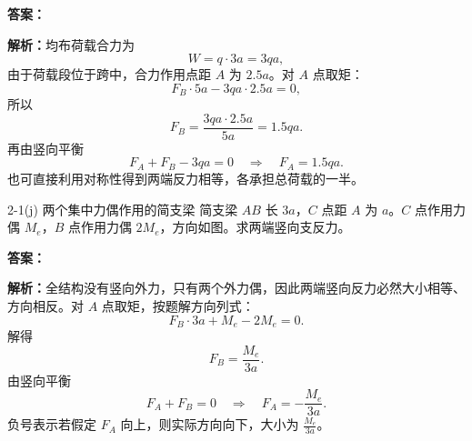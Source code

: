 \begin{solutioncard}
\textbf{答案：}

\textbf{解析：}均布荷载合力为
\[
  W=q\cdot3a=3qa,
\]
由于荷载段位于跨中，合力作用点距 \(A\) 为 \(2.5a\)。对 \(A\) 点取矩：
\[
  F_B\cdot5a-3qa\cdot2.5a=0,
\]
所以
\[
  F_B=\frac{3qa\cdot2.5a}{5a}=1.5qa.
\]
再由竖向平衡
\[
  F_A+F_B-3qa=0
  \quad\Rightarrow\quad
  F_A=1.5qa.
\]
也可直接利用对称性得到两端反力相等，各承担总荷载的一半。
\end{solutioncard}

\begin{problemcard}{2-1(j) 两个集中力偶作用的简支梁}
简支梁 \(AB\) 长 \(3a\)，\(C\) 点距 \(A\) 为 \(a\)。\(C\) 点作用力偶 \(M_e\)，\(B\) 点作用力偶 \(2M_e\)，方向如图。求两端竖向支反力。

\begin{figure}[H]
\centering
{}
\end{figure}
\end{problemcard}

\begin{solutioncard}
\textbf{答案：}

\textbf{解析：}全结构没有竖向外力，只有两个外力偶，因此两端竖向反力必然大小相等、方向相反。对 \(A\) 点取矩，按题解方向列式：
\[
  F_B\cdot3a+M_e-2M_e=0 .
\]
解得
\[
  F_B=\frac{M_e}{3a}.
\]
由竖向平衡
\[
  F_A+F_B=0
  \quad\Rightarrow\quad
  F_A=-\frac{M_e}{3a}.
\]
负号表示若假定 \(F_A\) 向上，则实际方向向下，大小为 \(\frac{M_e}{3a}\)。
\end{solutioncard}

